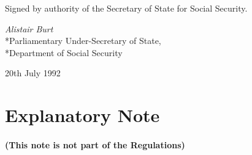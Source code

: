 \documentclass[12pt,a4paper]{article}
\begin{document}
%
%
%
%
%
%
%
%

\bigskip

Signed by authority of the Secretary of State for Social Security.

{\raggedleft
\emph{Alistair Burt}\\*Parliamentary Under-Secretary of State,\\*Department of Social Security

}

20th July 1992

\part{Explanatory Note}

\renewcommand\parthead{--- Explanatory Note}

\subsection*{(This note is not part of the Regulations)}
\end{document}
